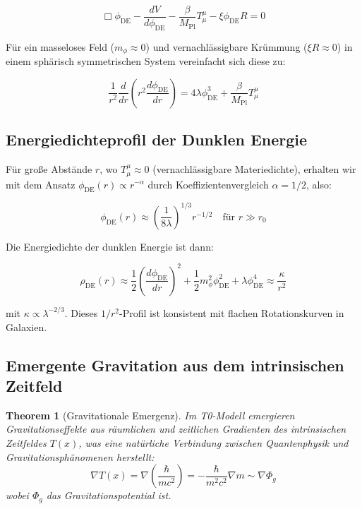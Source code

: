 \documentclass[a4paper,12pt]{article}
\newtheorem{theorem}{Theorem}[section]
\theoremstyle{definition}
\theoremstyle{remark}
\newcommand{\Tfield}{T(x)} %
\begin{document}
	\begin{equation}
		\Box\phi_{\text{DE}} - \frac{dV}{d\phi_{\text{DE}}} - \frac{\beta}{M_{\text{Pl}}}T^{\mu}_{\mu} - \xi \phi_{\text{DE}} R = 0
	\end{equation}
	
	Für ein masseloses Feld ($m_{\phi} \approx 0$) und vernachlässigbare Krümmung ($\xi R \approx 0$) in einem sphärisch symmetrischen System vereinfacht sich diese zu:
	
	\begin{equation}
		\frac{1}{r^2}\frac{d}{dr}\left(r^2\frac{d\phi_{\text{DE}}}{dr}\right) = 4\lambda\phi_{\text{DE}}^3 + \frac{\beta}{M_{\text{Pl}}}T^{\mu}_{\mu}
	\end{equation}
	
	\subsection{Energiedichteprofil der Dunklen Energie}
	
	Für große Abstände $r$, wo $T^{\mu}_{\mu} \approx 0$ (vernachlässigbare Materiedichte), erhalten wir mit dem Ansatz $\phi_{\text{DE}}(r) \propto r^{-\alpha}$ durch Koeffizientenvergleich $\alpha = 1/2$, also:
	
	\begin{equation}
		\phi_{\text{DE}}(r) \approx \left(\frac{1}{8\lambda}\right)^{1/3} r^{-1/2} \quad \text{für } r \gg r_0
	\end{equation}
	
	Die Energiedichte der dunklen Energie ist dann:
	
	\begin{equation}
		\rho_{\text{DE}}(r) \approx \frac{1}{2}\left(\frac{d\phi_{\text{DE}}}{dr}\right)^2 + \frac{1}{2}m_{\phi}^2\phi_{\text{DE}}^2 + \lambda\phi_{\text{DE}}^4 \approx \frac{\kappa}{r^2}
	\end{equation}
	
	mit $\kappa \propto \lambda^{-2/3}$. Dieses $1/r^2$-Profil ist konsistent mit flachen Rotationskurven in Galaxien.
	
	\subsection{Emergente Gravitation aus dem intrinsischen Zeitfeld}
	
	\begin{theorem}[Gravitationale Emergenz]
		Im T0-Modell emergieren Gravitationseffekte aus räumlichen und zeitlichen Gradienten des intrinsischen Zeitfeldes $\Tfield$, was eine natürliche Verbindung zwischen Quantenphysik und Gravitationsphänomenen herstellt:
		\begin{equation}
			\nabla \Tfield = \nabla \left(\frac{\hbar}{mc^2}\right) = -\frac{\hbar}{m^2c^2}\nabla m \sim \nabla \Phi_g
		\end{equation}
		wobei $\Phi_g$ das Gravitationspotential ist.
	\end{theorem}
	
\end{document}
